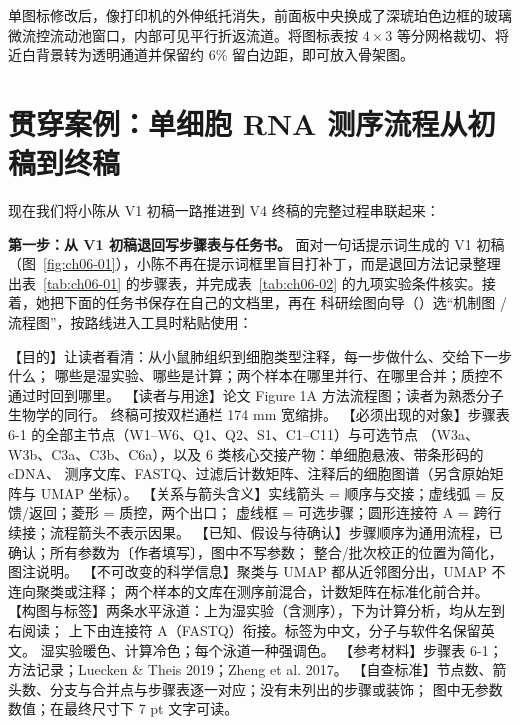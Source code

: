 
单图标修改后，像打印机的外伸纸托消失，前面板中央换成了深琥珀色边框的玻璃微流控流动池窗口，内部可见平行折返流道。将图标表按 $4 \times 3$ 等分网格裁切、将近白背景转为透明通道并保留约 6\% 留白边距，即可放入骨架图。

\section{贯穿案例：单细胞 RNA 测序流程从初稿到终稿}

现在我们将小陈从 V1 初稿一路推进到 V4 终稿的完整过程串联起来：

\textbf{第一步：从 V1 初稿退回写步骤表与任务书。}
面对一句话提示词生成的 V1 初稿（图~\ref{fig:ch06-01}），小陈不再在提示词框里盲目打补丁，而是退回方法记录整理出表~\ref{tab:ch06-01} 的步骤表，并完成表~\ref{tab:ch06-02} 的九项实验条件核实。接着，她把下面的任务书保存在自己的文档里，再在 \scidraw{} 科研绘图向导（）选“机制图 / 流程图”，按路线进入工具时粘贴使用：

\begin{Prompt}
【目的】让读者看清：从小鼠肺组织到细胞类型注释，每一步做什么、交给下一步什么；
         哪些是湿实验、哪些是计算；两个样本在哪里并行、在哪里合并；质控不通过时回到哪里。
【读者与用途】论文 Figure 1A 方法流程图；读者为熟悉分子生物学的同行。
         终稿可按双栏通栏 174 mm 宽缩排。
【必须出现的对象】步骤表 6-1 的全部主节点（W1–W6、Q1、Q2、S1、C1–C11）与可选节点
         （W3a、W3b、C3a、C3b、C6a），以及 6 类核心交接产物：单细胞悬液、带条形码的 cDNA、
         测序文库、FASTQ、过滤后计数矩阵、注释后的细胞图谱（另含原始矩阵与 UMAP 坐标）。
【关系与箭头含义】实线箭头 = 顺序与交接；虚线弧 = 反馈/返回；菱形 = 质控，两个出口；
         虚线框 = 可选步骤；圆形连接符 A = 跨行续接；流程箭头不表示因果。
【已知、假设与待确认】步骤顺序为通用流程，已确认；所有参数为〔作者填写〕，图中不写参数；
         整合/批次校正的位置为简化，图注说明。
【不可改变的科学信息】聚类与 UMAP 都从近邻图分出，UMAP 不连向聚类或注释；
         两个样本的文库在测序前混合，计数矩阵在标准化前合并。
【构图与标签】两条水平泳道：上为湿实验（含测序），下为计算分析，均从左到右阅读；
         上下由连接符 A（FASTQ）衔接。标签为中文，分子与软件名保留英文。
         湿实验暖色、计算冷色；每个泳道一种强调色。
【参考材料】步骤表 6-1；方法记录；Luecken & Theis 2019；Zheng et al. 2017。
【自查标准】节点数、箭头数、分支与合并点与步骤表逐一对应；没有未列出的步骤或装饰；
         图中无参数数值；在最终尺寸下 7 pt 文字可读。
\end{Prompt}

